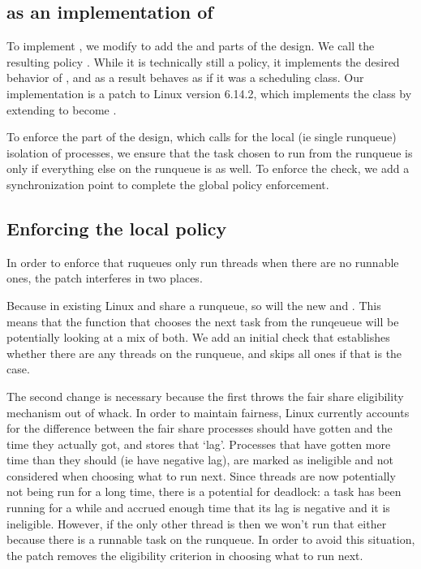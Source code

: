 \subsection{\schedbe{} as an implementation of \beclass{}}

To implement \beclass{}, we modify \schedidle{} to add the \local{} and \exit{}
parts of the \beclass{} design. We call the resulting policy \schedbe{}. While
it is technically still a policy, it implements the desired behavior of
\beclass{}, and as a result behaves as if it was a scheduling class. Our
implementation is a patch to Linux version 6.14.2, which implements the
\beclass{} class by extending \schedidle{} to become \schedbe{}.

To enforce the \local{} part of the design, which calls for the local (ie single
runqueue) isolation of \schedbe{} processes, we ensure that the task chosen to
run from the runqueue is only \schedbe{} if everything else on the runqueue is
as well. To enforce the \exit{} check, we add a synchronization point to
complete the global policy enforcement.

\subsection{Enforcing the local policy}

In order to enforce that ruqueues only run \schedbe{} threads when there are no
runnable \schednormal{} ones, the patch interferes in two places. 

Because in existing Linux \schedidle{} and \schednormal{} share a runqueue, so
will the new \schedbe{} and \schednormal{}. This means that the function that
chooses the next task from the runqeueue will be potentially looking at a mix of
both. We add an initial check that establishes whether there are any
\schednormal{} threads on the runqueue, and skips all \schedbe{} ones if that is
the case. 

The second change is necessary because the first throws the fair share
eligibility mechanism out of whack. In order to maintain fairness, Linux
currently accounts for the difference between the fair share processes should
have gotten and the time they actually got, and stores that `lag'. Processes
that have gotten more time than they should (ie have negative lag), are marked
as ineligible and not considered when choosing what to run next. Since
\schedbe{} threads are now potentially not being run for a long time, there is a
potential for deadlock: a \schednormal{} task has been running for a while and
accrued enough time that its lag is negative and it is ineligible. However, if
the only other thread is \schedbe{} then we won't run that either because there
is a runnable \schednormal{} task on the runqueue. In order to avoid this
situation, the patch removes the eligibility criterion in choosing what to run
next.



